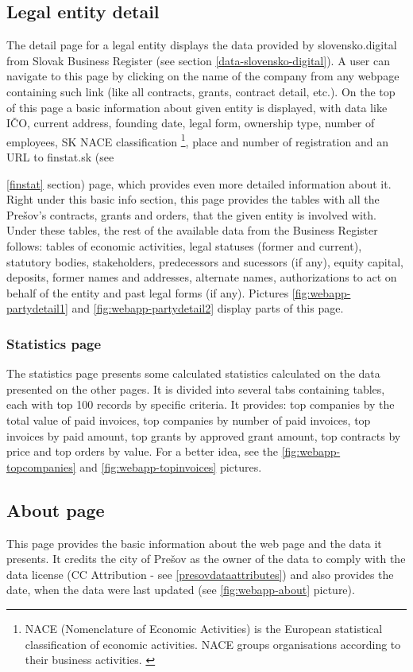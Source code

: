 \documentclass[thesis=B,english]{sprlajur-slovakopendata}[2018/05/12]
\begin{document}
\subsection{Legal entity detail}
The detail page for a legal entity displays the data provided by slovensko.digital from Slovak Business Register (see section \ref{data-slovensko-digital}). A user can navigate to this page by clicking on the name of the company from any webpage containing such link (like all contracts, grants, contract detail, etc.). On the top of this page a basic information about given entity is displayed, with data like IČO, current address, founding date, legal form, ownership type, number of employees, SK NACE classification \footnote{NACE (Nomenclature of Economic Activities) is the European statistical classification of economic activities. NACE groups organisations according to their business activities. \cite{nace}}, place and number of registration and an URL to finstat.sk (see {\ref{finstat} section) page, which provides even more detailed information about it. Right under this basic info section, this page provides the tables with all the Prešov's contracts, grants and orders, that the given entity is involved with. Under these tables, the rest of the available data from the Business Register follows: tables of economic activities, legal statuses (former and current), statutory bodies, stakeholders,  predecessors and sucessors (if any), equity capital, deposits, former names and addresses, alternate names, authorizations to act on behalf of the entity and past legal forms (if any). Pictures \ref{fig:webapp-partydetail1} and \ref{fig:webapp-partydetail2} display parts of this page.
	
	
	\subsubsection{Statistics page}
	The statistics page presents some calculated statistics calculated on the data presented on the other pages. It is divided into several tabs containing tables, each with top 100 records by specific criteria. It provides: top companies by the total value of paid invoices, top companies by number of paid invoices, top invoices by paid amount, top grants by approved grant amount, top contracts by price and top orders by value. For a better idea, see the \ref{fig:webapp-topcompanies} and \ref{fig:webapp-topinvoices} pictures.
	
	\subsection{About page}
	This page provides the basic information about the web page and the data it presents. It credits the city of Prešov as the owner of the data to comply with the data license (CC Attribution - see \ref{presovdataattributes}) and also provides the date, when the data were last updated (see \ref{fig:webapp-about} picture).
	
}
\end{document}
